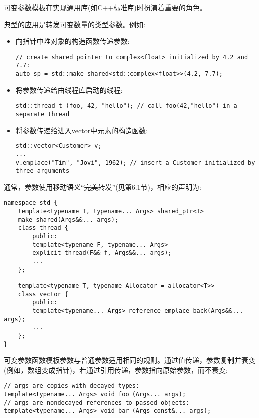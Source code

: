 可变参数模板在实现通用库(如C++标准库)时扮演着重要的角色。

典型的应用是转发可变数量的类型参数。例如:

\begin{itemize}
\item 
向指针中堆对象的构造函数传递参数:
\begin{lstlisting}[style=styleCXX]
// create shared pointer to complex<float> initialized by 4.2 and 7.7:
auto sp = std::make_shared<std::complex<float>>(4.2, 7.7);
\end{lstlisting}

\item 
将参数传递给由线程库启动的线程:
\begin{lstlisting}[style=styleCXX]
std::thread t (foo, 42, "hello"); // call foo(42,"hello") in a separate thread
\end{lstlisting}

\item 
将参数传递给进入vector中元素的构造函数:
\begin{lstlisting}[style=styleCXX]
std::vector<Customer> v;
...
v.emplace("Tim", "Jovi", 1962); // insert a Customer initialized by three arguments
\end{lstlisting}

\end{itemize}

通常，参数使用移动语义“完美转发”(见第6.1节)，相应的声明为:

\begin{lstlisting}[style=styleCXX]
namespace std {
	template<typename T, typename... Args> shared_ptr<T>
	make_shared(Args&&... args);
	class thread {
		public:
		template<typename F, typename... Args>
		explicit thread(F&& f, Args&&... args);
		...
	};

	template<typename T, typename Allocator = allocator<T>>
	class vector {
		public:
		template<typename... Args> reference emplace_back(Args&&... args);
		...
	};
}
\end{lstlisting}

可变参数函数模板参数与普通参数适用相同的规则。通过值传递，参数复制并衰变(例如，数组变成指针)，若通过引用传递，参数指向原始参数，而不衰变:

\begin{lstlisting}[style=styleCXX]
// args are copies with decayed types:
template<typename... Args> void foo (Args... args);
// args are nondecayed references to passed objects:
template<typename... Args> void bar (Args const&... args);
\end{lstlisting}


































